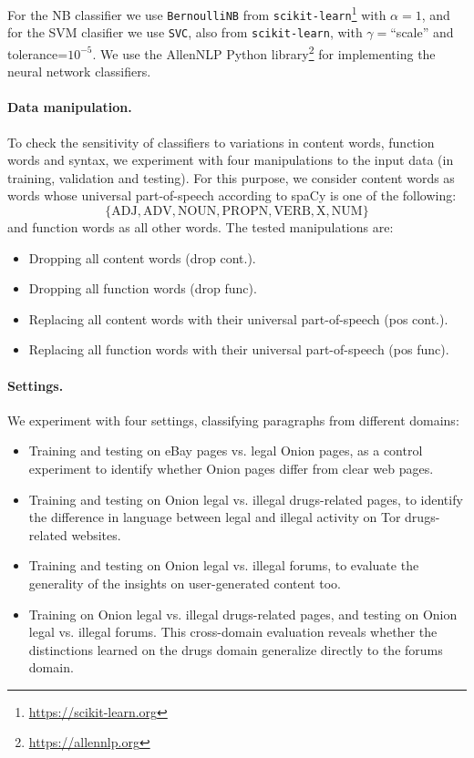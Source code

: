 \documentclass[11pt,a4paper,table]{article}
\begin{document}
For the NB classifier we use \texttt{BernoulliNB} from
\texttt{scikit-learn}\footnote{\url{https://scikit-learn.org}}
with $\alpha=1$,
and for the SVM clasifier we use \texttt{SVC}, also from \texttt{scikit-learn},
with $\gamma=$``scale'' and tolerance=$10^{-5}$.
We use the AllenNLP Python library\footnote{\url{https://allennlp.org}}
\cite{Gardner2017AllenNLP} for implementing the neural network classifiers.

\paragraph{Data manipulation.}

To check the sensitivity of classifiers to variations in content words,
function words and syntax, we experiment with four manipulations to the input
data (in training, validation and testing).
For this purpose, we consider content words as words whose universal part-of-speech
according to spaCy is one of the following:
\[\{\mathrm{ADJ, ADV, NOUN, PROPN, VERB, X, NUM}\}\]
and function words as all other words.
The tested manipulations are:

\begin{itemize}
  \item Dropping all content words (drop cont.).
  \item Dropping all function words (drop func).
  \item Replacing all content words with their universal part-of-speech (pos cont.).
  \item Replacing all function words with their universal part-of-speech (pos func).
\end{itemize}

\paragraph{Settings.}

We experiment with four settings, classifying paragraphs from different domains:
\begin{itemize}
  \item Training and testing on eBay pages vs. legal Onion pages,
  as a control experiment
  to identify whether Onion pages differ from clear web pages.
  \item Training and testing on Onion legal vs. illegal drugs-related pages,
  to identify the difference in language between legal and illegal activity
  on Tor drugs-related websites.
  \item Training and testing on Onion legal vs. illegal forums,
  to evaluate the generality of the insights on user-generated content too.
  \item Training on Onion legal vs. illegal drugs-related pages,
  and testing on Onion legal vs. illegal forums.
  This cross-domain evaluation reveals whether the distinctions learned on the
  drugs domain generalize directly to the forums domain.
\end{itemize}
\end{document}
